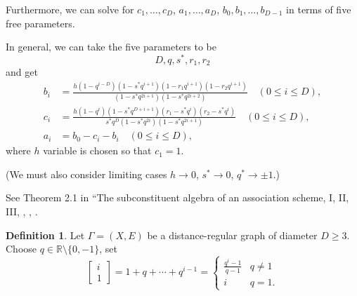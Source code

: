 \documentclass[
]{book}
\theoremstyle{definition}
\newtheorem{definition}{Definition}[chapter]
\theoremstyle{definition}
\theoremstyle{definition}
\theoremstyle{definition}
\theoremstyle{remark}
\begin{document}
Furthermore, we can solve for \(c_1, \ldots, c_D\), \(a_1, \ldots, a_D\), \(b_0, b_1, \ldots, b_{D-1}\) in terms of five free parameters.

In general, we can take the five parameters to be
\[D, q, s^*, r_1, r_2\]
and get
\begin{align}
b_i & = \frac{h(1-q^{i-D})(1-s^*q^{i+1})(1-r_1q^{i+1})(1-r_2q^{i+1})}{(1-s^*q^{2i+1})(1-s^*q^{2i+2})} \quad (0\leq i\leq D),\\
c_i & = \frac{h(1-q^{i})(1-s^*q^{D+i+1})(r_1-s^*q^{i})(r_2-s^*q^{i})}{s^*q^D(1-s^*q^{2i})(1-s^*q^{2i+1})} \quad (0\leq i\leq D),\\
a_i & = b_0 - c_i - b_i \quad (0\leq i\leq D),
\end{align}
where \(h\) variable is chosen so that \(c_1 = 1\).

(We must also consider limiting cases \(h\to 0\), \(s^*\to 0\), \(q^*\to \pm 1\).)

See Theorem 2.1 in ``The subconstituent algebra of an association scheme, I, II, III, \citep{terwilliger:1992}, \citep{terwilliger:1993-1}, \citep{terwilliger:1993-2}.

\begin{definition}
\protect\hypertarget{def:qbinomial}{}\label{def:qbinomial}Let \(\Gamma = (X,E)\) be a distance-regular graph of diameter \(D\geq 3\). Choose \(q \in \mathbb{R}\setminus \{0,-1\}\), set
\[\begin{bmatrix}{i}\\{1}\end{bmatrix} = 1 + q + \cdots + q^{i-1} = \begin{cases} \frac{q^i-1}{q-1} & q\neq 1\\
i & q = 1.\end{cases}\]
\end{definition}
\end{document}
